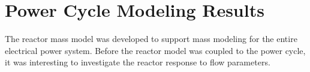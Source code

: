 \section{Power Cycle Modeling Results}
The reactor mass model was developed to support mass modeling for the entire
electrical power system. Before the reactor model was coupled to the power
cycle, it was interesting to investigate the reactor response to flow
parameters.
